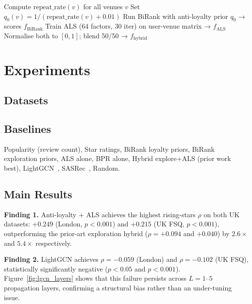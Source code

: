 \documentclass{article}
\begin{document}
\begin{algorithm}
\caption{Anti-Loyalty + ALS Hybrid}
\begin{algorithmic}[1]
\STATE Compute $\text{repeat\_rate}(v)$ for all venues $v$
\STATE Set $q_0(v) = 1/(\text{repeat\_rate}(v) + 0.01)$
\STATE Run BiRank with anti-loyalty prior $q_0$ → scores $f_{\text{BiRank}}$
\STATE Train ALS (64 factors, 30 iter) on user-venue matrix → $f_{\text{ALS}}$
\STATE Normalise both to $[0,1]$; blend 50/50 → $f_{\text{hybrid}}$
\end{algorithmic}
\end{algorithm}

\section{Experiments}
\label{sec:experiments}

\subsection{Datasets}



\subsection{Baselines}

Popularity (review count), Star ratings, BiRank loyalty priors,
BiRank exploration priors, ALS alone, BPR alone,
Hybrid explore+ALS (prior work best), LightGCN~\cite{he2020lightgcn},
SASRec~\cite{kang2018sasrec}, Random.

\subsection{Main Results}



\noindent\textbf{Finding 1.}
Anti-loyalty + ALS achieves the highest rising-stars $\rho$ on both UK
datasets: $+0.249$ (London, $p{<}0.001$) and $+0.215$ (UK FSQ, $p{<}0.001$),
outperforming the prior-art exploration hybrid ($\rho{=}+0.094$ and
$+0.040$) by $2.6\times$ and $5.4\times$ respectively.

\noindent\textbf{Finding 2.}
LightGCN achieves $\rho{=}-0.059$ (London) and $\rho{=}-0.102$ (UK FSQ),
statistically significantly negative ($p{<}0.05$ and $p{<}0.001$).
Figure~\ref{fig:lgcn_layers} shows that this failure persists across
$L{=}1$--$5$ propagation layers, confirming a structural bias rather
than an under-tuning issue.
\end{document}
